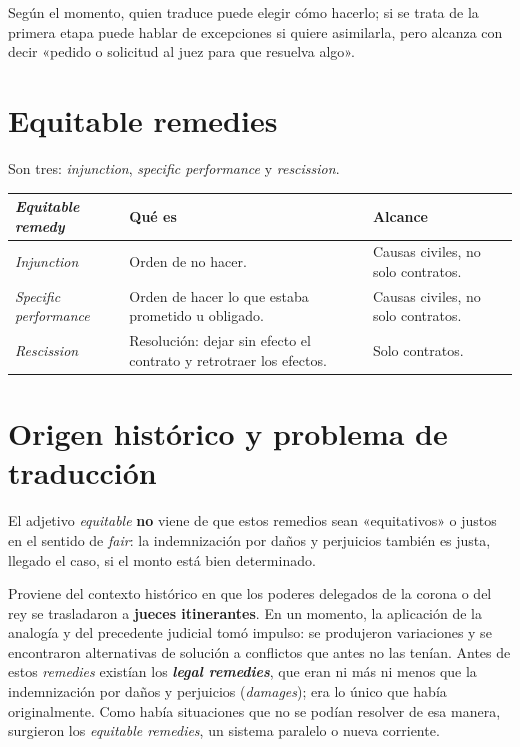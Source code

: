 \documentclass[12pt,oneside]{book}
\begin{document}
Según el momento, quien traduce puede elegir cómo hacerlo; si se trata de la primera etapa puede hablar de excepciones si quiere asimilarla, pero alcanza con decir «pedido o solicitud al juez para que resuelva algo».

\section{Equitable remedies}

Son tres: \textit{injunction}, \textit{specific performance} y \textit{rescission}.

\begin{table}[H]
\centering
\begin{tabularx}{\textwidth}{P{3.6cm}LL}
\toprule
\textbf{\textit{Equitable remedy}} & \textbf{Qué es} & \textbf{Alcance} \\
\midrule
\textit{Injunction} & Orden de no hacer. & Causas civiles, no solo contratos. \\
\textit{Specific performance} & Orden de hacer lo que estaba prometido u obligado. & Causas civiles, no solo contratos. \\
\textit{Rescission} & Resolución: dejar sin efecto el contrato y retrotraer los efectos. & Solo contratos. \\
\bottomrule
\end{tabularx}
\end{table}

\section{Origen histórico y problema de traducción}

El adjetivo \textit{equitable} \textbf{no} viene de que estos remedios sean «equitativos» o justos en el sentido de \textit{fair}: la indemnización por daños y perjuicios también es justa, llegado el caso, si el monto está bien determinado.

Proviene del contexto histórico en que los poderes delegados de la corona o del rey se trasladaron a \textbf{jueces itinerantes}. En un momento, la aplicación de la analogía y del precedente judicial tomó impulso: se produjeron variaciones y se encontraron alternativas de solución a conflictos que antes no las tenían. Antes de estos \textit{remedies} existían los \textbf{\textit{legal remedies}}, que eran ni más ni menos que la indemnización por daños y perjuicios (\textit{damages}); era lo único que había originalmente. Como había situaciones que no se podían resolver de esa manera, surgieron los \textit{equitable remedies}, un sistema paralelo o nueva corriente.
\end{document}
